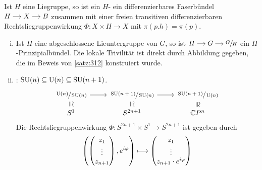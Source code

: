 \begin{definition}[{name=[Prinzipalbündel]}]
	Ist $H$ eine Liegruppe, so ist ein $H$- ein differenzierbares Faserbündel \(
		\begin{tikzcd}[cramped,sep=small]
			H \rar & X \rar & B
		\end{tikzcd}
	\)
	zusammen mit einer freien transitiven differenzierbaren Rechtsliegruppenwirkung $\Phi \colon X \times H \to X$ mit $\pi(p.h) = \pi(p)$.
\end{definition}

\begin{beispiel*}[{name=[Prinzipalbündel]}]
	\begin{enumerate}[(i)]
		\item Ist $H$ eine abgeschlossene Lieuntergruppe von $G$, so ist \(
			\begin{tikzcd}[cramped,sep=small]
				H \rar & G \rar & \sfrac{G}{H}
			\end{tikzcd}
		\) ein $H$-Prinzipialbündel. 
		Die lokale Trivilität ist direkt durch Abbildung gegeben, die im Beweis von \autoref{satz:312} konstruiert wurde.
		\item {}: $\SU(n) \subseteq \Un(n) \subseteq \SU(n+1)$.
		\[
			\begin{tikzcd}
				\sfrac{\Un(n)}{\SU(n)} \dar[phantom,sloped,"\cong"] \rar & \sfrac{\SU(n+1)}{\SU(n)} \dar[phantom,sloped,"\cong"] \rar &  \sfrac{\SU(n+1)}{\Un(n)} \dar[phantom,sloped,"\cong"] \\[-1em]
				S^1 & S^{2n+1} & \mathbb{C}P^n
			\end{tikzcd}
		\] 
		Die Rechtsliegruppenwirkung $\Phi \colon S^{2n+1} \times S^1 \to S^{2n+1}$ ist gegeben durch
		\[
			\enbrace*{\begin{pmatrix}
				z_1 \\ \vdots \\ z_{n+1}
			\end{pmatrix}, e^{i \varphi}} \longmapsto
			\begin{pmatrix}
				z_1 \\ \vdots \\ z_{n+1} \cdot e^{i \varphi}
			\end{pmatrix}
		\]
	\end{enumerate}
\end{beispiel*}

